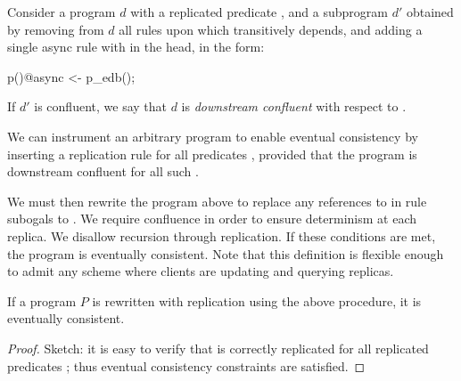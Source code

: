 Consider a \lang program $d$ with a replicated predicate , and a subprogram
$d'$ obtained by removing from $d$ all rules upon which  transitively 
depends, and adding a single async rule with  in the head, in the form:

\begin{Dedalus}
p()@async <- p_edb();
\end{Dedalus}

If $d'$ is confluent, we say that $d$ is {\em downstream confluent} with respect to 
.

We can instrument an arbitrary \lang program to enable eventual consistency by inserting a replication rule for all predicates , provided that the program is downstream
confluent for all such .

We must then rewrite the program above  to 
replace any references to  in rule subogals to .
We require confluence in order to ensure determinism at each replica.  We disallow recursion through replication.  If these conditions are met, the program is eventually consistent.  Note that this definition is flexible enough to admit any scheme where clients are updating and querying replicas.  


\begin{theorem}
If a program $P$ is rewritten with replication using the above procedure, it is eventually consistent.
\end{theorem}
\begin{proof}
Sketch: it is easy to verify that  is correctly replicated for all replicated predicates ; thus eventual consistency constraints are satisfied.
\end{proof}
